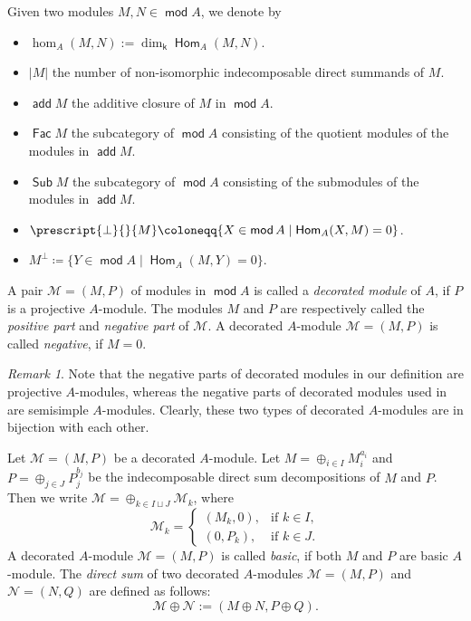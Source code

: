 \documentclass[10pt]{amsart}
\theoremstyle{definition}
\theoremstyle{remark}
\newtheorem{remark}[theorem]{Remark}
\numberwithin{equation}{section}
\def\mod{\opname{mod}\nolimits}
\newcommand{\opname}[1]{\operatorname{\mathsf{#1}}}
\newcommand{\Fac}{\opname{Fac}}
\newcommand{\Hom}{\opname{Hom}}
\newcommand{\Sub}{\opname{Sub}}
\newcommand{\add}{\opname{add}\nolimits}
\begin{document}
Given two modules $M, N\in\mod A$, we denote by
\begin{itemize}
\item $\hom_A(M,N):=\dim_{\mathsf k} \Hom_A(M,N)$.
\item $|M|$ the number of non-isomorphic indecomposable direct summands of $M$.
\item $\add M$  the additive closure of $M$ in $\mod A$.
\item $\Fac M$ the subcategory of $\mod A$ consisting of the quotient modules of the modules in $\add M$.
\item $\Sub M$ the subcategory of $\mod A$ consisting of the submodules of the modules in $\add M$.
\item $\prescript{\bot}{}{M} \coloneqq   \{X\in \mod A  \mid \Hom_{A}(X,M)=0\}$.
\item $M^{\bot} \coloneqq   \{Y\in \mod A  \mid \Hom_{A}(M,Y)=0\}$.

\end{itemize}


A pair $\mathcal M=(M,P)$ of modules in $\mod A$ is called a {\em decorated module} of $A$, if $P$ is a projective $A$-module. The modules $M$ and $P$ are respectively called the {\em positive part} and {\em negative part} of $\mathcal M$.
A decorated $A$-module $\mathcal M=(M,P)$ is called {\em negative}, if $M=0$.

\begin{remark}
Note that the negative parts of decorated modules in our definition are projective $A$-modules, whereas the negative parts of decorated modules used in \cite{DWZ10} are semisimple $A$-modules. Clearly, these two types of decorated $A$-modules are in bijection with each other. 
\end{remark}

Let $\mathcal M=(M,P)$ be a decorated $A$-module.
Let $M=\oplus_{i\in I} M_i^{a_i}$ and $P=\oplus_{j\in J}P_j^{b_j}$ be the indecomposable direct sum decompositions of $M$ and $P$. Then we write $\mathcal M=\oplus_{k\in I\sqcup J}\mathcal M_k$, where 
\[
\mathcal M_k=
\begin{cases}
 (M_k,0),& \text{if }k\in I,\\
 (0,P_k),&\text{if } k\in J.
\end{cases}
\]
A decorated $A$-module $\mathcal M=(M,P)$ is called {\em basic}, if both $M$ and $P$ are basic $A$-module. The {\em direct sum} of two decorated $A$-modules  $\mathcal M=(M,P)$ and $\mathcal N=(N,Q)$ are defined as follows:
\[\mathcal M\oplus \mathcal N:=(M\oplus N,P\oplus Q).\]
\end{document}
